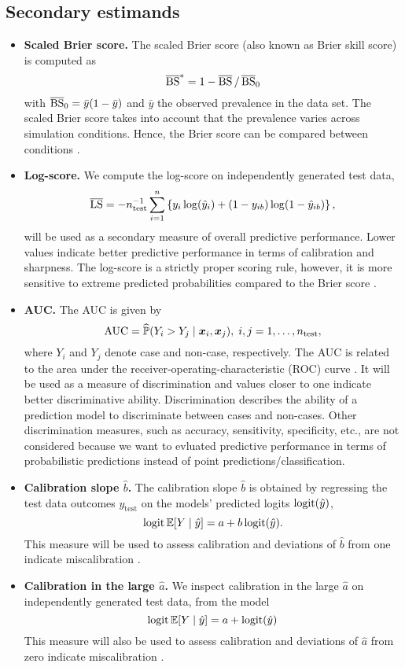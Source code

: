 \documentclass[a4paper, 11pt]{article}\usepackage[]{graphicx}\usepackage[]{color}
\begin{document}
\subsection{Secondary estimands}
\begin{itemize}
  \item \textbf{Scaled Brier score.} The scaled Brier score (also known as Brier skill score) is computed as
  $$\operatorname{\overline{BS}}^{*} = 1 - \operatorname{\overline{BS}}/\operatorname{\overline{BS}}_{0}$$
  with $\operatorname{\overline{BS}}_{0} = \bar{y}(1 - \bar{y})$ and $\bar{y}$ the observed prevalence in
  the data set. The scaled Brier score takes into account that the
  prevalence varies across simulation conditions. Hence, the Brier score
  can be compared between conditions \citep{Schmid2005, steyerberg2019clinical}.

  \item \textbf{Log-score.} We compute the log-score on independently generated test data,
  $$\operatorname{\overline{LS}} = - n_{\text{test}}^{-1} \sum_{i=1}^n \left\{ y_{i} \log(\hat{y}_{i})
  + (1 - y_{ib}) \log (1 - \hat{y}_{ib})\right\},$$
  will be used as a secondary measure of overall predictive performance. Lower
  values indicate better predictive performance in terms of calibration and
  sharpness. The log-score is a strictly proper scoring rule, however, it is more
  sensitive to extreme predicted probabilities compared to the Brier score \citep{Gneiting2007}.
  
  \item \textbf{AUC.} The AUC is given by
  $$\text{AUC} = \widehat{\mathbb{P}}(Y_i > Y_j \mid \text{\boldmath$x$}_i, \text{\boldmath$x$}_j), \; i,j = 1, \dots, n_{\text{test}},$$
  where $Y_i$ and $Y_j$ denote case and non-case, respectively. The AUC is related
  to the area under the receiver-operating-characteristic (ROC) curve \citep{steyerberg2019clinical}.
  It will be used as a measure of discrimination and values closer to one
  indicate better discriminative ability. Discrimination describes the ability
  of a prediction model to discriminate between cases and non-cases.
  Other discrimination measures, such as accuracy, sensitivity, specificity, etc.,
  are not considered because we want to evluated predictive performance
  in terms of probabilistic predictions instead of point predictions/classification.

  \item \textbf{Calibration slope $\hat b$.}  
  The calibration slope $\hat b$ is obtained by regressing
  the test data outcomes $y_{\text{test}}$ on the models' predicted logits $\operatorname{logit}({\hat{y}})$,
  \ie
  $$\operatorname{logit}\mathbb{E}[Y \mid \hat{y}] = a + b\operatorname{logit}(\hat{y}).$$
  This measure will be used to assess calibration and deviations of $\hat b$ from
  one indicate miscalibration \citep{steyerberg2019clinical}.

  \item \textbf{Calibration in the large $\hat a$.} We inspect calibration in the
  large $\hat a$ on independently generated test data, from the model
  $$\operatorname{logit}\mathbb{E}[Y \mid \hat{y}] = a + \operatorname{logit}(\hat{y})$$
  This measure will also be used to assess calibration and deviations of $\hat a$ from
  zero indicate miscalibration \citep{steyerberg2019clinical}.
\end{itemize}
\end{document}
